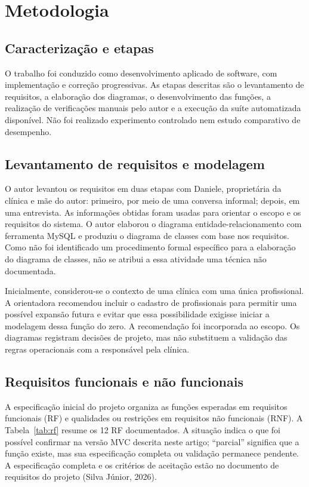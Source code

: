 \documentclass[12pt,a4paper]{article}
\begin{document}
\section{Metodologia}

\subsection{Caracterização e etapas}

O trabalho foi conduzido como desenvolvimento aplicado de software, com implementação e correção progressivas. As etapas descritas são o levantamento de requisitos, a elaboração dos diagramas, o desenvolvimento das funções, a realização de verificações manuais pelo autor e a execução da suíte automatizada disponível. Não foi realizado experimento controlado nem estudo comparativo de desempenho.

\subsection{Levantamento de requisitos e modelagem}

O autor levantou os requisitos em duas etapas com Daniele, proprietária da clínica e mãe do autor: primeiro, por meio de uma conversa informal; depois, em uma entrevista. As informações obtidas foram usadas para orientar o escopo e os requisitos do sistema. O autor elaborou o diagrama entidade-relacionamento com ferramenta MySQL e produziu o diagrama de classes com base nos requisitos. Como não foi identificado um procedimento formal específico para a elaboração do diagrama de classes, não se atribui a essa atividade uma técnica não documentada.

Inicialmente, considerou-se o contexto de uma clínica com uma única profissional. A orientadora recomendou incluir o cadastro de profissionais para permitir uma possível expansão futura e evitar que essa possibilidade exigisse iniciar a modelagem dessa função do zero. A recomendação foi incorporada ao escopo. Os diagramas registram decisões de projeto, mas não substituem a validação das regras operacionais com a responsável pela clínica.

\subsection{Requisitos funcionais e não funcionais}

A especificação inicial do projeto organiza as funções esperadas em requisitos funcionais (RF) e qualidades ou restrições em requisitos não funcionais (RNF). A Tabela~\ref{tab:rf} resume os 12 RF documentados. A situação indica o que foi possível confirmar na versão MVC descrita neste artigo; ``parcial'' significa que a função existe, mas sua especificação completa ou validação permanece pendente. A especificação completa e os critérios de aceitação estão no documento de requisitos do projeto (Silva Júnior, 2026).
\end{document}
